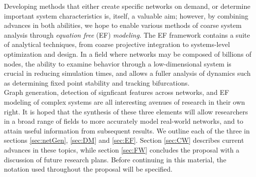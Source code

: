 \documentclass[11pt]{article}
\begin{document}
\indent Developing methods that either create specific networks on demand, or determine important system characteristics is, itself, a valuable aim; however, by combining advances in both abilities, we hope to enable various methods of coarse system analysis through \textit{equation free} (EF) \textit{modeling}. The EF framework contains a suite of analytical techniques, from coarse projective integration to systems-level optimization and design. In a field where networks may be composed of billions of nodes, the ability to examine behavior through a low-dimensional system is crucial in reducing simulation times, and allows a fuller analysis of dynamics such as determining fixed point stability and tracking bifurcations.\vspace{1mm}\\
\indent Graph generation, detection of signficant features across networks, and EF modeling of complex systems are all interesting avenues of research in their own right. It is hoped that the synthesis of these three elements will allow researchers in a broad range of fields to more accurately model real-world networks, and to attain useful information from subsequent results. We outline each of the three in sections \ref{sec:netGen}, \ref{sec:DM} and \ref{sec:EF}. Section \ref{sec:CW} describes current advances in these topics, while section \ref{sec:FW} concludes the proposal with a discussion of future research plans. Before continuing in this material, the notation used throughout the proposal will be specified.
\end{document}
